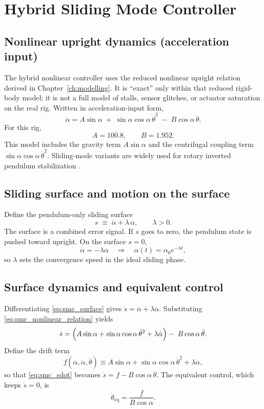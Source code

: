 \section{Hybrid Sliding Mode Controller}
\label{ch:smc}

\subsection{Nonlinear upright dynamics (acceleration input)}
The hybrid nonlinear controller uses the reduced nonlinear upright relation derived in Chapter~\ref{ch:modelling}. It is ``exact'' only within that reduced rigid-body model; it is not a full model of stalls, sensor glitches, or actuator saturation on the real rig. Written in acceleration-input form,
\begin{equation}
\ddot{\alpha}
=
A\sin\alpha
\;+\;
\sin\alpha\cos\alpha\,\dot{\theta}^2
\;-\;
B\cos\alpha\,\ddot{\theta}.
\label{eq:smc_nonlinear_relation}
\end{equation}
For this rig,
\[
A=100.8,\qquad B=1.952.
\]
This model includes the gravity term $A\sin\alpha$ and the centrifugal coupling term $\sin\alpha\cos\alpha\,\dot{\theta}^2$. Sliding-mode variants are widely used for rotary inverted pendulum stabilization \cite{Yigit2017,Nguyen2020,Pham2024}.

\subsection{Sliding surface and motion on the surface}
Define the pendulum-only sliding surface
\begin{equation}
s \;\equiv\; \dot{\alpha} + \lambda\,\alpha,\qquad \lambda>0.
\label{eq:smc_surface}
\end{equation}
The surface is a combined error signal. If $s$ goes to zero, the pendulum state is pushed toward upright. On the surface $s=0$,
\[
\dot{\alpha}=-\lambda\alpha \quad\Rightarrow\quad \alpha(t)=\alpha_0 e^{-\lambda t},
\]
so $\lambda$ sets the convergence speed in the ideal sliding phase.

\subsection{Surface dynamics and equivalent control}
Differentiating \eqref{eq:smc_surface} gives $\dot{s}=\ddot{\alpha}+\lambda\dot{\alpha}$. Substituting \eqref{eq:smc_nonlinear_relation} yields
\begin{equation}
\dot{s}
=
\Bigl(A\sin\alpha+\sin\alpha\cos\alpha\,\dot{\theta}^2+\lambda\dot{\alpha}\Bigr)
-\;B\cos\alpha\,\ddot{\theta}.
\label{eq:smc_sdot}
\end{equation}
Define the drift term
\[
f(\alpha,\dot{\alpha},\dot{\theta}) \equiv A\sin\alpha+\sin\alpha\cos\alpha\,\dot{\theta}^2+\lambda\dot{\alpha},
\]
so that \eqref{eq:smc_sdot} becomes $\dot{s}=f-B\cos\alpha\,\ddot{\theta}$. The equivalent control, which keeps $\dot{s}=0$, is
\begin{equation}
\ddot{\theta}_{\mathrm{eq}}=\frac{f}{B\cos\alpha}.
\label{eq:smc_eq_control}
\end{equation}

